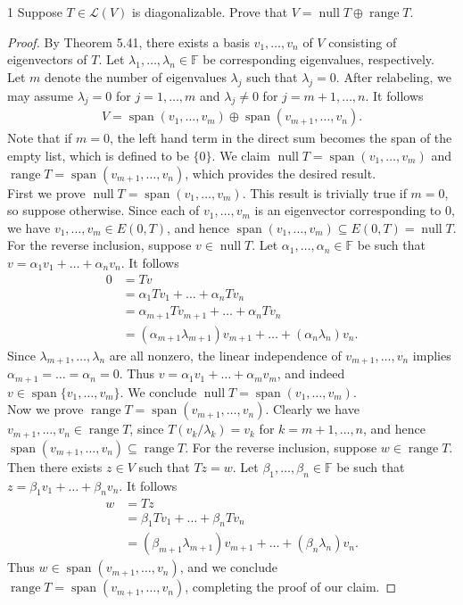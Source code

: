 \documentclass{extarticle}
\newenvironment{problem}[1]{\begin{prob*}{#1}{}}{\end{prob*}}
\newcommand{\F}{\mathbb{F}}
\DeclareMathOperator{\Span}{span}
\newcommand{\Hom}{\mathcal{L}}
\DeclareMathOperator{\Null}{null}
\DeclareMathOperator{\Range}{range}
\begin{document}
\begin{problem}{1}
Suppose $T\in\Hom(V)$ is diagonalizable.  Prove that $V = \Null T\oplus\Range T$.
\end{problem}
\begin{proof}
By Theorem 5.41, there exists a basis $v_1,\dots, v_n$ of $V$ consisting of eigenvectors of $T$.  Let $\lambda_1,\dots, \lambda_n\in\F$ be corresponding eigenvalues, respectively.   Let $m$ denote the number of eigenvalues $\lambda_j$ such that $\lambda_j = 0$.  After relabeling, we may assume $\lambda_j = 0$ for $j=1,\dots, m$ and $\lambda_j \neq 0$ for $j = m+1,\dots,n$.  It follows
\begin{align*}
V = \Span(v_1,\dots, v_m)\oplus \Span(v_{m+1},\dots,v_n).
\end{align*}
Note that if $m = 0$, the left hand term in the direct sum becomes the span of the empty list, which is defined to be $\{0\}$.  We claim $\Null T =  \Span(v_1,\dots, v_m)$ and $\Range T = \Span(v_{m+1},\dots,v_n)$, which provides the desired result.\\
\indent First we prove $\Null T = \Span(v_1,\dots, v_m)$.  This result is trivially true if $m=0$, so suppose otherwise.  Since each of $v_1,\dots,v_m$ is an eigenvector corresponding to $0$, we have $v_1,\dots,v_m\in E(0,T)$, and hence $\Span(v_1,\dots,v_m)\subseteq E(0, T)=\Null T$.  For the reverse inclusion, suppose $v\in \Null T$.  Let $\alpha_1,\dots,\alpha_n\in\F$ be such that $v = \alpha_1v_1 + \dots + \alpha_nv_n$.  It follows
\begin{align*}
0 &= Tv\\
&= \alpha_1Tv_1 + \dots + \alpha_nTv_n\\
&= \alpha_{m+1}Tv_{m+1} + \dots + \alpha_nTv_n\\
&= (\alpha_{m+1}\lambda_{m+1})v_{m+1} + \dots + (\alpha_n\lambda_n) v_n.
\end{align*}
Since $\lambda_{m+1},\dots, \lambda_{n}$ are all nonzero, the linear independence of $v_{m+1},\dots, v_{n}$ implies $\alpha_{m+1} = \dots = \alpha_n = 0$.  Thus $v = \alpha_1v_1 + \dots + \alpha_mv_m$, and indeed $v\in\Span\{v_1,\dots,v_m\}$.  We conclude $\Null T = \Span(v_1,\dots, v_m)$.\\
\indent Now we prove $\Range T = \Span(v_{m+1},\dots, v_n)$.  Clearly we have $v_{m+1},\dots,v_n\in\Range T$, since $T(v_k/\lambda_k) = v_k$ for $k = m+1,\dots, n$, and hence $\Span(v_{m+1},\dots, v_n)\subseteq \Range T$.  For the reverse inclusion, suppose $w\in \Range T$.  Then there exists $z\in V$ such that $Tz = w$.  Let $\beta_1,\dots,\beta_n\in\F$ be such that $z = \beta_1v_1 + \dots + \beta_nv_n$.  It follows
\begin{align*}
w &= Tz\\
&= \beta_1Tv_1 + \dots + \beta_nTv_n\\
&= (\beta_{m+1}\lambda_{m+1})v_{m+1} + \dots + (\beta_n\lambda_n)v_n.
\end{align*}
Thus $w\in \Span(v_{m+1},\dots,v_n)$, and we conclude $\Range T = \Span(v_{m+1},\dots,v_n)$, completing the proof of our claim.
\end{proof}
\end{document}
